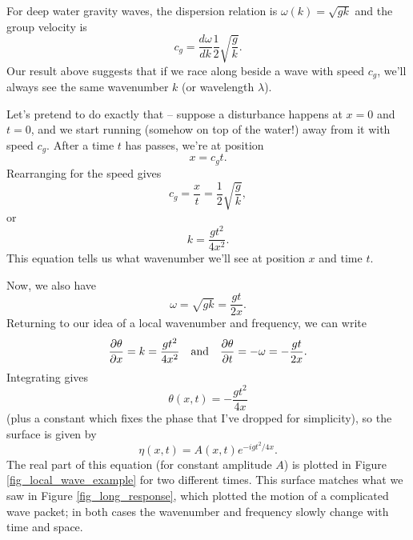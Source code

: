 \begin{example}
For deep water gravity waves, the dispersion relation is $\omega(k) = \sqrt{gk}$ and the group velocity is
\[
c_g = \frac{d\omega}{dk} \frac{1}{2} \sqrt{ \frac{g}{k} }.
\]
Our result above suggests that if we race along beside a wave with speed $c_g$, we'll always see the same wavenumber $k$ (or wavelength $\lambda$).

Let's pretend to do exactly that -- suppose a disturbance happens at $x=0$ and $t = 0$, and we start running (somehow on top of the water!) away from it with speed $c_g$.  After a time $t$ has passes, we're at position
\[
x = c_g t.
\]
Rearranging for the speed gives
\[
c_g = \frac{x}{t} = \frac{1}{2} \sqrt{ \frac{g}{k} },
\]
or
\begin{equation}
k = \frac{gt^2}{4x^2}.
\end{equation}
This equation tells us what wavenumber we'll see at position $x$ and time $t$.

Now, we also have
\begin{equation}
\omega = \sqrt{gk} = \frac{gt}{2x}.
\end{equation}
Returning to our idea of a local wavenumber and frequency, we can write
\[
\frac{\partial {\theta}}{\partial {x}} = k = \frac{gt^2}{4x^2} \quad \text{and} \quad \frac{\partial {\theta}}{\partial {t}} = -\omega = -\frac{gt}{2x}.
\]
Integrating gives
\begin{equation}
\theta(x, t) = -\frac{gt^2}{4x}
\end{equation}
(plus a constant which fixes the phase that I've dropped for simplicity), so the surface is given by
\begin{equation}
\label{eq_surface_reponse}
\eta(x, t) = A(x, t) e^{-i gt^2/4x}.
\end{equation}
The real part of this equation (for constant amplitude $A$) is plotted in Figure \ref{fig_local_wave_example} for two different times.  This surface matches what we saw in Figure \ref{fig_long_response}, which plotted the motion of a complicated wave packet; in both cases the wavenumber and frequency slowly change with time and space.
\end{example}

